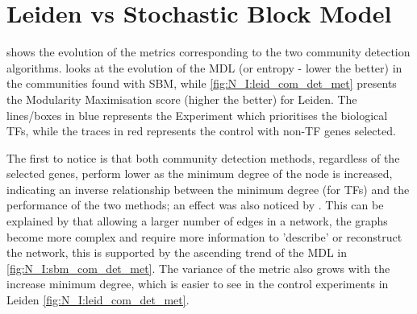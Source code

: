 \section{Leiden vs Stochastic Block Model} \label{s:N_I:sel_tf_com_det}

 shows the evolution of the metrics corresponding to the two community detection algorithms.  looks at the evolution of the MDL (or entropy - lower the better) in the communities found with SBM, while \cref{fig:N_I:leid_com_det_met} presents the Modularity Maximisation score (higher the better) for Leiden. The lines/boxes in blue represents the Experiment which prioritises the biological TFs, while the traces in red represents the control with non-TF genes selected. 

The first to notice is that both community detection methods, regardless of the selected genes, perform lower as the minimum degree of the node is increased, indicating an inverse relationship between the minimum degree (for TFs) and the performance of the two methods; an effect was also noticed by \citet{Care2019-ij}. This can be explained by that allowing a larger number of edges in a network, the graphs become more complex and require more information to 'describe' or reconstruct the network, this is supported by the ascending trend of the MDL in \cref{fig:N_I:sbm_com_det_met}. The variance of the metric also grows with the increase minimum degree, which is easier to see in the control experiments in Leiden \cref{fig:N_I:leid_com_det_met}.

